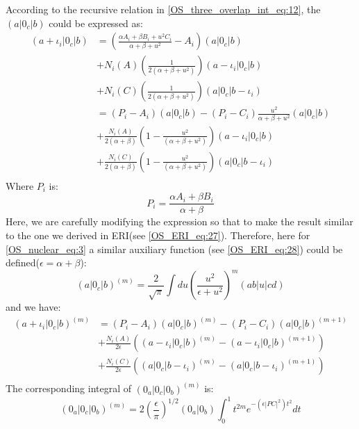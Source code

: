 According to the recursive relation in \ref{OS_three_overlap_int_eq:12},
the $(a|0_{c}|b)$ could be expressed as:
\begin{equation}
 \begin{split}
  (a+\iota_{i}|0_{c}|b) 
&= \left( \frac{\alpha A_{i} + \beta B_{i} + u^{2}C_{i}}{\alpha+\beta+u^{2}} -
A_{i}\right) (a|0_{c}|b)  \\
&+ 
N_{i}(A)\left(\frac{1}{2(\alpha+\beta+u^{2})}\right)(a-\iota_{i}|0_{c}|b) \\
&+
N_{i}(C)\left(\frac{1}{2(\alpha+\beta+u^{2})}\right)(a|0_{c}|b-\iota_{i}) \\
&= \left( P_{i}  - A_{i}\right) (a|0_{c}|b) - (P_{i} - C_{i})
\frac{u^{2}}{\alpha+\beta+u^{2}}(a|0_{c}|b)  \\
&+ 
\frac{N_{i}(A)}{2(\alpha+\beta)}\left(1-\frac{u^{2}}{(\alpha+\beta+u^{2})}
\right)(a-\iota_{i}|0_{ c }|b) \\
&+
\frac{N_{i}(C)}{2(\alpha+\beta)}\left(1-\frac{u^{2}}{(\alpha+\beta+u^{2})}
\right)(a|0_{c}|b-\iota_{i}) \\
 \end{split}
\label{OS_nuclear_eq:3}
\end{equation}
Where $P_{i}$ is:
\begin{equation}
 P_{i} = \frac{\alpha A_{i} + \beta B_{i}}{\alpha+\beta}
\end{equation}
Here, we are carefully modifying the expression so that to make the result
similar to the one we derived in ERI(see \ref{OS_ERI_eq:27}). Therefore,
here for \ref{OS_nuclear_eq:3} a similar auxiliary function (see
\ref{OS_ERI_eq:28}) could be defined($\epsilon = \alpha+\beta$):
\begin{equation}
\label{OS_nuclear_eq:4}
  (a|0_{c}|b)^{(m)} = \frac{2}{\sqrt{\pi}}\int du \left( \frac{u^{2}}
{\epsilon+u^{2}}\right)^{m}(ab|u|cd) 
\end{equation}
and we have:
\begin{equation}
 \begin{split}
  (a+\iota_{i}|0_{c}|b)^{(m)} &=  
\left( P_{i}  - A_{i}\right) (a|0_{c}|b)^{(m)} - (P_{i} - C_{i})
(a|0_{c}|b)^{(m+1)}  \\
&+ 
\frac{N_{i}(A)}{2\epsilon}\left(
(a-\iota_{i}|0_{ c }|b)^{(m)}-
(a-\iota_{i}|0_{ c }|b)^{(m+1)}
\right) \\
&+
\frac{N_{i}(C)}{2\epsilon}\left(
(a|0_{c}|b-\iota_{i})^{(m)}-
(a|0_{c}|b-\iota_{i})^{(m+1)}
\right) \\
 \end{split}
\label{OS_nuclear_eq:5}
\end{equation}
The corresponding integral of $(0_{a}|0_{c}|0_{b})^{(m)}$ is:
\begin{equation}
\label{OS_nuclear_eq:6}
 (0_{a}|0_{c}|0_{b})^{(m)} = 2\left(
\frac{\epsilon}{\pi}\right)^{1/2}(0_{a}|0_{b})
\int^{1}_{0} t^{2m} e^{-(\epsilon|PC|^{2})t^{2}} dt 
\end{equation}


